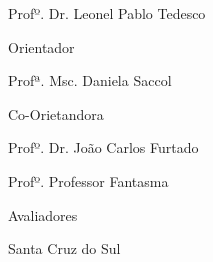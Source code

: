 \begin{titlepage}
\thispagestyle{empty}
	\begin{center}
	\par \vspace{100pt} {\textsc \nomedocurso} %
	\par \vspace{100pt} {\nomedoaluno} %
	\par \vspace{4cm}{\textbf{\textsc{\titulo}}} %
	\vspace{2cm}
	\begin{center}
	Profº. Dr. Leonel Pablo Tedesco

	Orientador	

	Profª. Msc. Daniela Saccol
	
	Co-Orietandora
	\end{center}
	\vspace{1cm}
	\begin{center}
	Profº. Dr. João Carlos Furtado
	
	Profº. Professor Fantasma
		
	Avaliadores		
	\end{center}
	\vspace{2cm}
	\par \vfill {{Santa Cruz do Sul}\\ {\the\year}}
	\end{center}
\end{titlepage}
